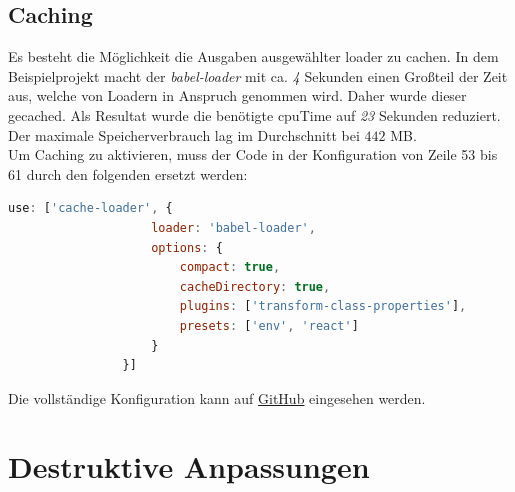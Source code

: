\documentclass[11pt]{report}
\begin{document}

    		\subsection{Caching}
    			Es besteht die Möglichkeit die Ausgaben ausgewählter \Gls{loader} zu cachen. In dem Beispielprojekt macht der \emph{babel-loader} mit ca. \emph{4} Sekunden einen Großteil der Zeit aus, welche von Loadern in Anspruch genommen wird. Daher wurde dieser gecached. Als Resultat wurde die benötigte \Gls{cpuTime} auf \emph{23} Sekunden reduziert. Der maximale Speicherverbrauch lag im Durchschnitt bei $442$ MB.\\
    			Um Caching zu aktivieren, muss der Code in der Konfiguration von Zeile 53 bis 61 durch den folgenden ersetzt werden:
    			\begin{center}
		        	\lstset{%
					    caption=Caching,
						basicstyle=\footnotesize,
						xleftmargin=.15\textwidth,
						xrightmargin=.15\textwidth,
						numbers=none
					}
		        	\begin{lstlisting}[language=JavaScript]
				use: ['cache-loader', {
				    loader: 'babel-loader',
				    options: {
				        compact: true,
				        cacheDirectory: true,
				        plugins: ['transform-class-properties'],
				        presets: ['env', 'react']
				    }
				}]
		        	\end{lstlisting}
	        	\end{center}
    			Die vollständige Konfiguration kann auf \href{https://github.com/TexNAK/WebBundlerOptimization/commit/370e3233461f32c823e6c794ad52179e15391ebc#diff-1fb5683b1e7adbcee273b7f9f9a08a22}{GitHub} eingesehen werden.
    			

    	\section{Destruktive Anpassungen}
\end{document}
